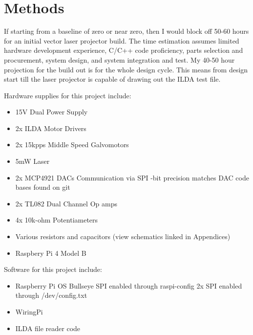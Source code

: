 \documentclass[journal]{IEEEtran}
\begin{document}
    \section{Methods}

    If starting from a baseline of zero or near zero, then I would block off 50-60 hours for an initial vector laser projector build. 
    The time estimation assumes limited hardware development experience, C/C++ code proficiency, parts selection and procurement, system design, and system integration and test.
    My 40-50 hour projection for the build out is for the whole design cycle. 
    This means from design start till the laser projector is capable of drawing out the ILDA test file.

    Hardware supplies for this project include:
    \begin{itemize}
        \item 15V Dual Power Supply
        \item 2x ILDA Motor Drivers
        \item 2x 15kpps Middle Speed Galvomotors
        \item 5mW Laser
        \item 2x MCP4921 DACs
        \newline Communication via SPI
        -bit precision matches DAC code bases found on git
        \item 2x TL082 Dual Channel Op amps
        \item 4x 10k-ohm Potentiameters
        \item Various resistors and capacitors (view schematics linked in Appendices)
        \item Raspbery Pi 4 Model B
    \end{itemize}

    Software for this project include:
    \begin{itemize}
        \item Raspberry Pi OS Bullseye
            \newline SPI enabled through raspi-config
            \newline 2x SPI enabled through /dev/config.txt
        \item WiringPi
        \item ILDA file reader code
    \end{itemize}
\end{document}
